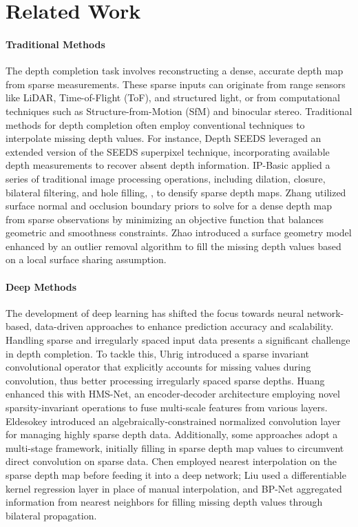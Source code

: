 \section{Related Work}

\paragraph{Traditional Methods}
The depth completion task involves reconstructing a dense, accurate depth map from sparse measurements. These sparse inputs can originate from range sensors like LiDAR, Time-of-Flight (ToF), and structured light, or from computational techniques such as Structure-from-Motion (SfM) and binocular stereo. Traditional methods for depth completion often employ conventional techniques to interpolate missing depth values. For instance, Depth SEEDS \cite{depth_seeds} leveraged an extended version of the SEEDS \cite{van2015seeds} superpixel technique, incorporating available depth measurements to recover absent depth information. IP-Basic \cite{ip_basic} applied a series of traditional image processing operations, including dilation, closure, bilateral filtering, and hole filling, \etc, to densify sparse depth maps. Zhang \etal \cite{zhang2018deep} utilized surface normal and occlusion boundary priors to solve for a dense depth map from sparse observations by minimizing an objective function that balances geometric and smoothness constraints. Zhao \etal \cite{zhao2021surface} introduced a surface geometry model enhanced by an outlier removal algorithm to fill the missing depth values based on a local surface sharing assumption. 

\paragraph{Deep Methods}
The development of deep learning has shifted the focus towards neural network-based, data-driven approaches to enhance prediction accuracy and scalability. Handling sparse and irregularly spaced input data presents a significant challenge in depth completion. To tackle this, Uhrig \etal \cite{uhrig2017sparsity} introduced a sparse invariant convolutional operator that explicitly accounts for missing values during convolution, thus better processing irregularly spaced sparse depths. Huang \etal \cite{huang2019hms} enhanced this with HMS-Net, an encoder-decoder architecture employing novel sparsity-invariant operations to fuse multi-scale features from various layers. Eldesokey \etal \cite{eldesokey2020uncertainty} introduced an algebraically-constrained normalized convolution layer for managing highly sparse depth data. Additionally, some approaches adopt a multi-stage framework, initially filling in sparse depth map values to circumvent direct convolution on sparse data. Chen \etal \cite{chen2018estimating} employed nearest interpolation on the sparse depth map before feeding it into a deep network; Liu \etal \cite{liu2021learning} used a differentiable kernel regression layer in place of manual interpolation, and BP-Net \cite{bp_net} aggregated information from nearest neighbors for filling missing depth values through bilateral propagation.

